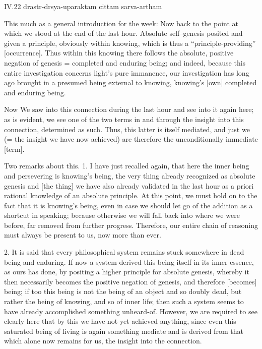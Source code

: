 IV.22
drastr-drsya-uparaktam cittam sarva-artham

This much as a general introduction for the week:
Now back to the point at which we stood at the end of the last hour.
Absolute self–genesis posited and given a principle,
obviously within knowing,
which is thus a “principle-providing” [occurrence].
Thus within this knowing there follows
the absolute, positive negation of genesis =
completed and enduring being;
and indeed, because this entire investigation
concerns light's pure immanence,
our investigation has long ago brought in
a presumed being external to knowing,
knowing's [own] completed and enduring being.

Now We saw into this connection during the last hour
and see into it again here;
as is evident, we see one of the two terms
in and through the insight into this connection,
determined as such.
Thus, this latter is itself mediated,
and just we (= the insight we have now achieved) are
therefore the unconditionally immediate [term].

Two remarks about this.
1. I have just recalled again,
that here the inner being and persevering is knowing's being,
the very thing already recognized as absolute genesis
and [the thing] we have also already validated in the last hour
as a priori rational knowledge of an absolute principle.
At this point, we must hold on to
the fact that it is knowing's being,
even in case we should let go of
the addition as a shortcut in speaking;
because otherwise we will fall back into
where we were before, far removed from further progress.
Therefore, our entire chain of reasoning
must always be present to us, now more than ever.

2. It is said that every philosophical system
remains stuck somewhere in dead being and enduring.
If now a system derived this being itself in its inner essence,
as ours has done, by positing a higher principle for absolute genesis,
whereby it then necessarily becomes the positive negation of genesis,
and therefore [becomes] being;
if too this being is not the being of an object and so doubly dead,
but rather the being of knowing, and so of inner life;
then such a system seems to have already
accomplished something unheard-of.
However, we are required to see clearly here that
by this we have not yet achieved anything,
since even this saturated being of living is
again something mediate and is derived from that
which alone now remains for us,
the insight into the connection.

